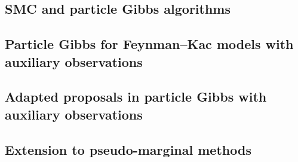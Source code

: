 

\subsection{SMC and particle Gibbs algorithms}
\label{subsec:pgibbs-refresh}


\subsection{Particle Gibbs for Feynman--Kac models with auxiliary observations}
\label{subsec:smc-samplers}


\subsection{Adapted proposals in particle Gibbs with auxiliary observations}
\label{subsec:guided-smc-sampler}


\subsection{Extension to pseudo-marginal methods}
\label{subsec:pseudo-marginal}


